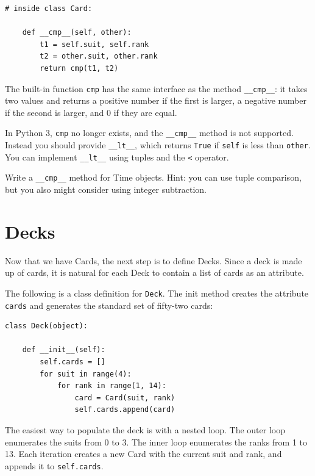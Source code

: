 \documentclass[10pt]{book}
\begin{document}
\begin{verbatim}
# inside class Card:

    def __cmp__(self, other):
        t1 = self.suit, self.rank
        t2 = other.suit, other.rank
        return cmp(t1, t2)
\end{verbatim}
%
The built-in function {\tt cmp} has the same interface as
the method \verb"__cmp__": it takes two values and returns
a positive number if the first is larger, a negative number
if the second is larger, and 0 if they are equal.

In Python 3, {\tt cmp} no longer exists, and the \verb"__cmp__"
method is not supported.  Instead you should provide \verb"__lt__",
which returns {\tt True} if {\tt self} is less than {\tt other}.
You can implement \verb"__lt__" using tuples and the \verb"<"
operator.

\begin{exercise}

Write a \verb"__cmp__" method for Time objects.  Hint: you
can use tuple comparison, but you also might consider using
integer subtraction.



\end{exercise}


\section{Decks}

Now that we have Cards, the next step is to define Decks.  Since a
deck is made up of cards, it is natural for each Deck to contain a
list of cards as an attribute.

The following is a class definition for {\tt Deck}.  The
init method creates the attribute {\tt cards} and generates
the standard set of fifty-two cards:

\begin{verbatim}
class Deck(object):

    def __init__(self):
        self.cards = []
        for suit in range(4):
            for rank in range(1, 14):
                card = Card(suit, rank)
                self.cards.append(card)
\end{verbatim}
%
The easiest way to populate the deck is with a nested loop.  The outer
loop enumerates the suits from 0 to 3.  The inner loop enumerates the
ranks from 1 to 13.  Each iteration
creates a new Card with the current suit and rank,
and appends it to {\tt self.cards}.
\end{document}
